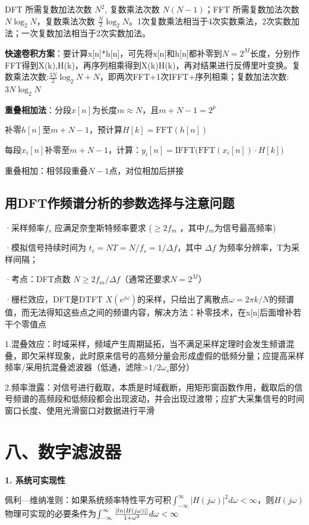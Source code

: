 DFT 所需复数加法次数 $N^2$, 复数乘法次数 $N(N-1)$；FFT 所需复数加法次数 $N\log_2 N$，复数乘法次数 $\frac{N}{2}\log_2 N$。1次复数乘法相当于4次实数乘法，2次实数加法；一次复数加法相当于2次实数加法。

\textbf{快速卷积方案}：要计算x[n]*h[n]，可先将x[n]和h[n]都补零到$N=2^M$长度，分别作FFT得到X(k),H(k)，再序列相乘得到X(k)H(k)，再对结果进行反傅里叶变换。复数乘法次数:$\frac{3N}{2}\log_2N+N$，即两次FFT+1次IFFT+序列相乘；复数加法次数: $3N\log_2 N$

\textbf{重叠相加法}：分段$x[n]$为长度$m\approx N$，且$m+N-1=2^p$

补零$h[n]$至$m+N-1$，预计算$H[k]=\text{FFT}(h[n])$

每段$x_i[n]$补零至$m+N-1$，计算：$y_i[n]=\text{IFFT}\big(\text{FFT}(x_i[n])\cdot H[k]\big)$

重叠相加：相邻段重叠$N-1$点，对位相加后拼接
\subsection*{用DFT作频谱分析的参数选择与注意问题}

·采样频率$f_s$ 应满足奈奎斯特频率要求 ($\geq 2f_m$ ，其中$f_m$为信号最高频率)

·模拟信号持续时间为 $t_c=NT=N/f_s=1/\Delta f$，其中 $\Delta f$ 为频率分辨率，T为采样间隔；

·考点：DFT点数 $N\geq 2f_m/\Delta f$（通常还要求$N=2^M$）

·栅栏效应，DFT是DTFT $X(e^{j\omega})$的采样，只给出了离散点$\omega=2\pi k/N$的频谱值，而无法得知这些点之间的频谱内容，解决方法：补零技术，在x[n]后面增补若干个零值点

1.混叠效应：时域采样，频域产生周期延拓，当不满足采样定理时会发生频谱混叠，即欠采样现象，此时原来信号的高频分量会形成虚假的低频分量；应提高采样频率/采用抗混叠滤波器（低通，滤除>$1/2\omega_s$部分）

2.频率泄露：对信号进行截取，本质是时域截断，用矩形窗函数作用，截取后的信号频谱的高频段和低频段都会出现波动，并会出现过渡带；应扩大采集信号的时间窗口长度、使用光滑窗口对数据进行平滑

\section*{八、数字滤波器}

\textbf{1. 系统可实现性}
   
佩利—维纳准则：如果系统频率特性平方可积$\int_{-\infty}^{\infty}|H(j\omega)|^2d\omega<\infty$，则$H(j\omega)$物理可实现的必要条件为$\int_{-\infty}^{\infty}{{|ln|H(j\omega)||}\over{1+\omega^2}}d\omega<\infty$

